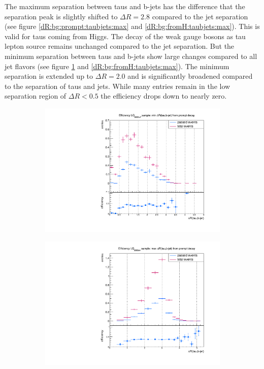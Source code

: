 %
The maximum separation between taus and b-jets has the difference that the separation peak is slightly shifted to $\Delta R=2.8$ compared to the jet separation (see figure \ref{dR:bg:prompt:taubjets:max} and \ref{dR:bg:fromH:taubjets:max}). This is valid for taus coming from Higgs. The decay of the weak gauge bosons as tau lepton source remains unchanged compared to the jet separation. But the minimum separation between taus and b-jets show large changes compared to all jet flavors (see figure \ref{dR:bg:prompt:taubjets:min} and \ref{dR:bg:fromH:taubjets:max}). The minimum separation is extended up to $\Delta R=2.0$ and is significantly broadened compared to the separation of taus and jets. While many entries remain in the low separation region of $\Delta R<0.5$ the efficiency drops down to nearly zero.
%
\begin{figure}
  \centering
                \begin{subfigure}[t]{0.49\textwidth}
                \includegraphics[width=\textwidth]{figures/plots/ttH/Divided_mindR_pr_taubjet.pdf}
                \label{dR:bg:prompt:taubjets:min}
                \end{subfigure}
                \begin{subfigure}[t]{0.49\textwidth}
                \includegraphics[width=\textwidth]{figures/plots/ttH/Divided_maxdR_pr_taubjet.pdf}

\end{subfigure}
\end{figure}

